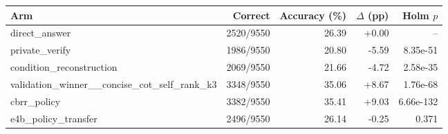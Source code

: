 \begin{tabular}{lrrrr}
\toprule
Arm & Correct & Accuracy (\%) & $\Delta$ (pp) & Holm $p$ \\
\midrule
direct\_answer & 2520/9550 & 26.39 & +0.00 & -- \\
private\_verify & 1986/9550 & 20.80 & -5.59 & 8.35e-51 \\
condition\_reconstruction & 2069/9550 & 21.66 & -4.72 & 2.58e-35 \\
validation\_winner\_\_concise\_cot\_self\_rank\_k3 & 3348/9550 & 35.06 & +8.67 & 1.76e-68 \\
cbrr\_policy & 3382/9550 & 35.41 & +9.03 & 6.66e-132 \\
e4b\_policy\_transfer & 2496/9550 & 26.14 & -0.25 & 0.371 \\
\bottomrule
\end{tabular}
